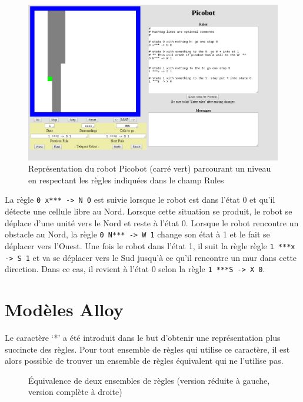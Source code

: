 \documentclass{article}
\begin{document}
\begin{figure}[H]
 \centerline{\includegraphics[scale=0.45]{pictures/Image1.png}}
\caption{Représentation du robot Picobot (carré vert) parcourant un niveau en respectant les règles indiquées dans le champ Rules}
 \end{figure}

La règle \texttt{0 x*** -> N 0} est suivie lorsque le robot est dans l'état 0 et qu'il détecte une cellule libre au Nord. Lorsque cette situation se produit, le robot se déplace d'une unité vers le Nord et reste à l'état 0. Lorsque le robot rencontre un obstacle au Nord, la règle \texttt{0 N*** -> W 1} change son état à 1 et le fait se déplacer vers l’Ouest. Une fois le robot dans l'état 1, il suit la règle règle \texttt{1 ***x -> S 1} et va se déplacer vers le Sud jusqu'à ce qu'il rencontre un mur dans cette direction. Dans ce cas, il revient à l'état 0 selon la règle \texttt{1 ***S -> X 0}.

\section{Modèles Alloy}
\label{sec:mod_alloy}
Le caractère ‘*’ a été introduit dans le but d’obtenir une représentation plus succincte des règles. Pour tout ensemble de règles qui utilise ce caractère, il est alors possible de trouver un ensemble de règles équivalent qui ne l’utilise pas.


\begin{figure}[H]
\caption{Équivalence de deux ensembles de règles (version réduite à gauche, version complète à droite)}
\end{figure}
\end{document}
